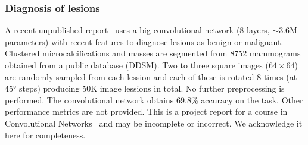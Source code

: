 \subsubsection{Diagnosis of lesions}
\begin{comment}
- not published report
- DDSM database (8752 mammograms)
- only lesion treatment
- they do ~detection (masses vs calcifications) and diagnosis (benign vs malignant).
- two convnest fpr eachtask
- lesions were segmented from the images using the truth labels. 
- Each image is selected so that the shorter dimension is 64 (the other dimension will normally be larger), then 2 to 3 patches are sampled at random positions and each one is rotated 8 times.
- resulted in 50K lesion images
- negative and benign = benign, everything else= malignant
- tried different network sizes.
- accuracy 87%
\end{comment}
A recent unpublished report~\cite{Agarwal2015} uses a big convolutional network (8 layers, $\sim$3.6M parameters) with recent features to diagnose lesions as benign or malignant. Clustered microcalcifications and masses are segmented from 8752 mammograms obtained from a public database (DDSM). Two to three square images ($64 \times 64$) are randomly sampled from each lession and each of these is rotated 8 times (at 45° steps) producing 50K image lessions in total. No further preprocessing is performed. The convolutional network obtains 69.8\% accuracy on the task. Other performance metrics are not provided. This is a project report for a course in Convolutional Networks~\cite{Karpathy2015} and may be incomplete or incorrect. We acknowledge it here for completeness.

\begin{comment}
- convolutional sparse autoencoder: semisupervised, convolutional networks are trained as a deep sparse autoencoder. Later full classification on the obtained features.
- 50K patches from 1K film mamograms
- does segmentation(background, pectoral muscle and breast tissue), density classification (fatty and dense) and risk scoring/diagnosis (healthy and disease)
- done per pixel.
- http://deep-learning.compute.dtu.dk/wp-content/uploads/2014/08/poster_Diao.pdf.
- Many convolutional networks are trained with segments of different scales and all results from different networks is used in the FC layers
\end{comment}

